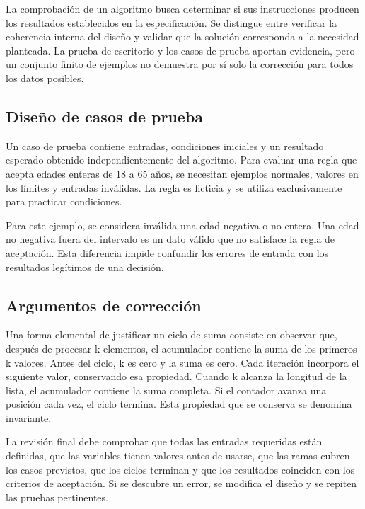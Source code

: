 La comprobación de un algoritmo busca determinar si sus instrucciones producen los resultados establecidos en la especificación. Se distingue entre verificar la coherencia interna del diseño y validar que la solución corresponda a la necesidad planteada. La prueba de escritorio y los casos de prueba aportan evidencia, pero un conjunto finito de ejemplos no demuestra por sí solo la corrección para todos los datos posibles.

\subsection{Diseño de casos de prueba}

Un caso de prueba contiene entradas, condiciones iniciales y un resultado esperado obtenido independientemente del algoritmo. Para evaluar una regla que acepta edades enteras de 18 a 65 años, se necesitan ejemplos normales, valores en los límites y entradas inválidas. La regla es ficticia y se utiliza exclusivamente para practicar condiciones.



Para este ejemplo, se considera inválida una edad negativa o no entera. Una edad no negativa fuera del intervalo es un dato válido que no satisface la regla de aceptación. Esta diferencia impide confundir los errores de entrada con los resultados legítimos de una decisión.

\subsection{Argumentos de corrección}

Una forma elemental de justificar un ciclo de suma consiste en observar que, después de procesar k elementos, el acumulador contiene la suma de los primeros k valores. Antes del ciclo, k es cero y la suma es cero. Cada iteración incorpora el siguiente valor, conservando esa propiedad. Cuando k alcanza la longitud de la lista, el acumulador contiene la suma completa. Si el contador avanza una posición cada vez, el ciclo termina. Esta propiedad que se conserva se denomina invariante.

La revisión final debe comprobar que todas las entradas requeridas están definidas, que las variables tienen valores antes de usarse, que las ramas cubren los casos previstos, que los ciclos terminan y que los resultados coinciden con los criterios de aceptación. Si se descubre un error, se modifica el diseño y se repiten las pruebas pertinentes.

